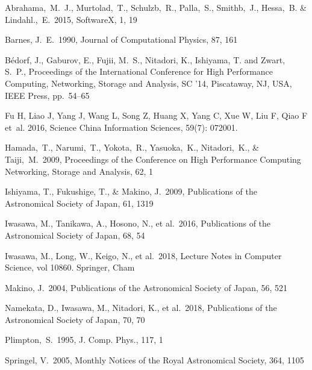 \documentclass[submit]{ipsj}
\newcommand{\mnras}{Monthly Notices of the Royal Astronomical Society}
\newcommand{\pasj}{Publications of the Astronomical Society of Japan}
\begin{document}
\begin{thebibliography}{9}

Abrahama,~M.~J., Murtolad,~T., Schulzb,~R., Palla,~S., Smithb,~J., Hessa,~B. \& Lindahl.,~E.\ 2015, SoftwareX, 1, 19

 Barnes, J.~E.\ 1990, Journal of Computational Physics, 87, 161 

 B{\'e}dorf, J., Gaburov, E.,
  Fujii, M.~S., Nitadori, K., Ishiyama, T. and Zwart, S.~P.,
  Proceedings of the International Conference for High Performance
  Computing, Networking, Storage and Analysis, SC '14, Piscataway, NJ,
  USA, IEEE Press, pp.\ 54--65
  
 Fu H, Liao J, Yang J, Wang L, Song Z, Huang X,
  Yang C, Xue W, Liu F, Qiao F et~al. 2016,  Science China Information Sciences, 59(7): 072001.

  Hamada,~T., Narumi,~T., Yokota,~R., Yasuoka,~K., Nitadori,~K., \& Taiji,~M.\ 2009, Proceedings of the Conference on High Performance Computing Networking, Storage and Analysis, 62, 1

 Ishiyama, T., Fukushige, T., \& Makino, J.\ 2009, \pasj, 61, 1319
  
 Iwasawa, M., Tanikawa, A., Hosono, N., et al.\ 2016, \pasj, 68, 54

 Iwasawa, M., Long, W., Keigo, N., et al.\ 2018, Lecture Notes in Computer Science, vol 10860. Springer, Cham

 Makino, J.\ 2004, \pasj, 56, 521
  
 Namekata, D., Iwasawa, M., Nitadori, K., et al.\ 2018, \pasj, 70, 70 

 Plimpton,~S.\ 1995, J. Comp. Phys., 117, 1
  
 Springel, V.\ 2005, \mnras, 364, 1105

\end{thebibliography}
\end{document}
